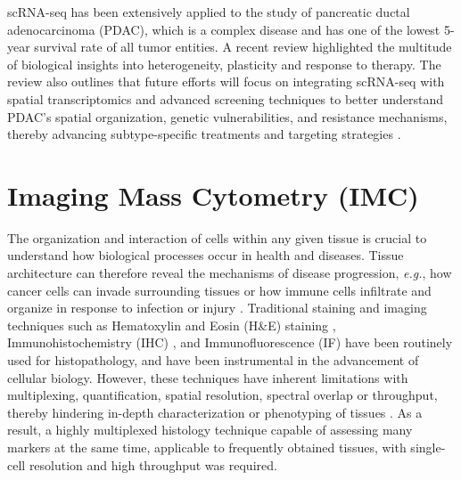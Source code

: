 scRNA-seq has been extensively applied to the study of pancreatic ductal adenocarcinoma (PDAC), which is a complex disease and has one of the lowest 5-year survival rate of all tumor entities. A recent review highlighted the multitude of biological insights into heterogeneity, plasticity and response to therapy. The review also outlines that future efforts will focus on integrating scRNA-seq with spatial transcriptomics and advanced screening techniques to better understand PDAC's spatial organization, genetic vulnerabilities, and resistance mechanisms, thereby advancing subtype-specific treatments and targeting strategies \textbf{\cite{barthel_single-cell_2023}}.





\section{Imaging Mass Cytometry (IMC)}  %
\label{sec:IMC}


The organization and interaction of cells within any given tissue is crucial to understand how biological processes occur in health and diseases. Tissue architecture can therefore reveal the mechanisms of disease progression, \textit{e.g.}, how cancer cells can invade surrounding tissues or how immune cells infiltrate and organize in response to infection or injury \textbf{\cite{veenstra_research_2021}}. Traditional staining and imaging techniques such as Hematoxylin and Eosin (H\&E) staining \textbf{\cite{titford_progress_2009}}, Immunohistochemistry (IHC) \textbf{\cite{ortiz_hidalgo_immunohistochemistry_2022}}, and Immunofluorescence (IF) \textbf{\cite{odell_immunofluorescence_2013}} have been routinely used for histopathology, and have been instrumental in the advancement of cellular biology. However, these techniques have inherent limitations with multiplexing, quantification, spatial resolution, spectral overlap or throughput, thereby hindering in-depth characterization or phenotyping of tissues \textbf{\cite{veenstra_research_2021,leroux_imaging_2021}}. As a result, a highly multiplexed histology technique capable of assessing many markers at the same time, applicable to frequently obtained tissues, with single-cell resolution and high throughput was required.\\

